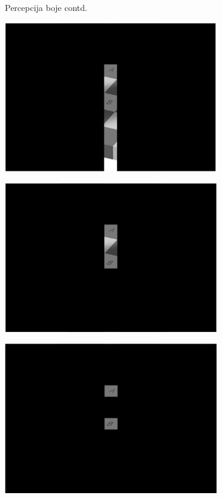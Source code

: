 \documentclass[9pt]{beamer}
\begin{document}
\begin{frame}{Percepcija boje contd.}
{\begin{center}
		\includegraphics[height=6.5cm]{slike/color_slide_116_cropped.jpg}
	\end{center}
	}
	 {
	\begin{center}
		\includegraphics[height=6.5cm]{slike/color_slide_117_cropped.jpg}
	\end{center}
	}
	 {
	\begin{center}
		\includegraphics[height=6.5cm]{slike/color_slide_118_cropped.jpg}
	\end{center}
	}
\end{frame}	
\end{document}
